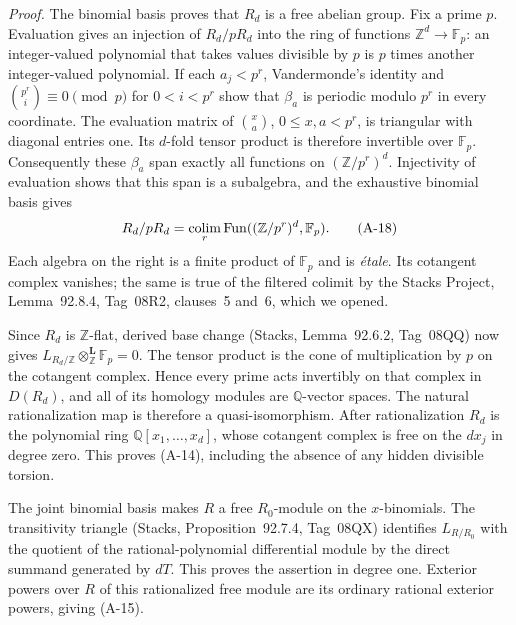\emph{Proof.}
The binomial basis proves that $R_d$ is a free abelian group. Fix a
prime $p$. Evaluation gives an injection of $R_d/pR_d$ into the
ring of functions $\mathbb Z^d\to\mathbb F_p$: an integer-valued
polynomial that takes values divisible by $p$ is $p$ times another
integer-valued polynomial. If each $a_j<p^r$, Vandermonde's identity
and $\binom{p^r}{i}\equiv0\pmod p$ for $0<i<p^r$ show that
$\beta_a$ is periodic modulo $p^r$ in every coordinate. The
evaluation matrix of $\binom xa$, $0\leq x,a<p^r$, is triangular
with diagonal entries one. Its $d$-fold tensor product is therefore
invertible over $\mathbb F_p$. Consequently these $\beta_a$ span
exactly all functions on $(\mathbb Z/p^r)^d$. Injectivity of
evaluation shows that this span is a subalgebra, and the exhaustive
binomial basis gives
\[
 R_d/pR_d=\mathop{\rm colim}_r
 \operatorname{Fun}((\mathbb Z/p^r)^d,\mathbb F_p).
 \tag{A-18}
\]
Each algebra on the right is a finite product of $\mathbb F_p$ and
is \emph{\'etale}. Its cotangent complex vanishes; the same is true
of the filtered colimit by the Stacks Project, Lemma~92.8.4,
Tag~08R2, clauses~5 and~6, which we opened.

Since $R_d$ is $\mathbb Z$-flat, derived base change
(Stacks, Lemma~92.6.2, Tag~08QQ) now gives
$L_{R_d/\mathbb Z}\otimes^{\mathbf L}_{\mathbb Z}\mathbb F_p=0$.
The tensor product is the cone of multiplication by $p$ on the
cotangent complex. Hence every prime acts invertibly on that
complex in $D(R_d)$, and all of its homology modules are
$\mathbb Q$-vector spaces. The natural rationalization map is
therefore a quasi-isomorphism. After rationalization $R_d$ is the
polynomial ring $\mathbb Q[x_1,\ldots,x_d]$, whose cotangent
complex is free on the $dx_j$ in degree zero. This proves (A-14),
including the absence of any hidden divisible torsion.

The joint binomial basis makes $R$ a free $R_0$-module on the
$x$-binomials. The transitivity triangle (Stacks,
Proposition~92.7.4, Tag~08QX) identifies $L_{R/R_0}$ with the
quotient of the rational-polynomial differential module by the
direct summand generated by $dT$. This proves the assertion in
degree one. Exterior powers over $R$ of this rationalized free
module are its ordinary rational exterior powers, giving (A-15).

